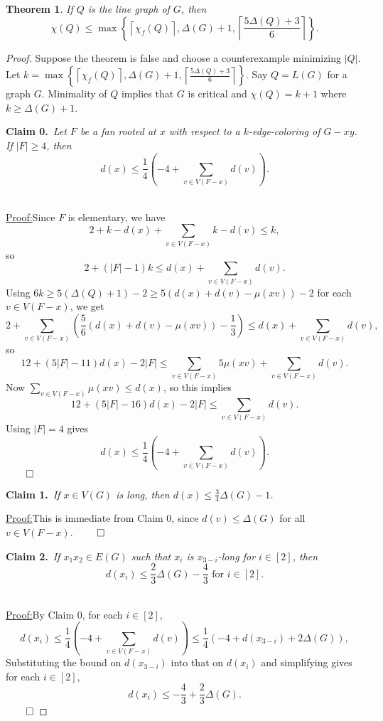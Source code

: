 \documentclass[12pt]{amsart}
\theoremstyle{plain}
\newtheorem{thm}{Theorem}
\theoremstyle{definition}
\theoremstyle{remark}
\newcommand{\set}[1]{\left\{ #1 \right\}}
\newcommand{\card}[1]{\left|#1\right|}
\newcommand{\ceil}[1]{\left\lceil#1\right\rceil}
\newcommand{\irange}[1]{\left[#1\right]}
\newcommand{\parens}[1]{\left( #1 \right)}
\newcommand{\claim}[2]{{\noindent\bf Claim #1.}~{\it #2}~~}
\newenvironment{claimproof}[1]{\par\noindent\underline{Proof:}\space#1}{\leavevmode\unskip\penalty9999
\hbox{}\nobreak\hfill\quad\hbox{$\qed$}}
\begin{document}
\begin{thm}
If $Q$ is the line graph of $G$, then
\[\chi(Q) \le \max\set{\ceil{\chi_f(Q)}, \Delta(G) + 1, \ceil{\frac{5\Delta(Q) + 3}{6}}}.\]
\end{thm}
\begin{proof}
Suppose the theorem is false and choose a counterexample minimizing $\card{Q}$.
Let $k = \max\set{\ceil{\chi_f(Q)}, \Delta(G) + 1, \ceil{\frac{5\Delta(Q) + 3}{6}}}$. Say $Q =
L(G)$ for a graph $G$. Minimality of $Q$ implies that $G$ is critical and $\chi(Q) = k+1$ where $k \ge \Delta(G) + 1$.

\bigskip

\claim{0}{Let $F$ be a fan rooted at $x$ with respect to a $k$-edge-coloring of $G - xy$.  If $|F| \ge 4$, then
\[d(x) \le \frac14\parens{-4 + \sum_{v \in V(F-x)} d(v)}.\]}
\begin{claimproof}
Since $F$ is elementary, we have
\[2 + k-d(x) + \sum_{v \in V(F-x)} k - d(v) \le k,\]
so
\[2 + (|F| - 1)k \le d(x) + \sum_{v \in V(F-x)} d(v).\]
Using $6k \ge 5(\Delta(Q) + 1) - 2 \ge 5(d(x) + d(v) - \mu(xv)) - 2$ for each $v \in V(F-x)$, we get
\[2 + \sum_{v \in V(F-x)}\parens{\frac56(d(x) + d(v) - \mu(xv)) -\frac13} \le d(x) + \sum_{v \in V(F-x)} d(v),\]
so
\[12 + \parens{5|F| - 11}d(x) - 2|F| \le \sum_{v \in V(F-x)} 5\mu(xv) + \sum_{v \in V(F-x)} d(v).\]
Now $\sum_{v \in V(F-x)} \mu(xv) \le d(x)$, so this implies
\[12 + \parens{5|F| - 16}d(x) - 2|F| \le \sum_{v \in V(F-x)} d(v).\]
Using $|F| = 4$ gives
\[d(x) \le \frac14\parens{-4 + \sum_{v \in V(F-x)} d(v)}.\]
\end{claimproof}
\bigskip

\claim{1}{If $x \in V(G)$ is long, then $d(x) \le \frac34\Delta(G) - 1$.}

\begin{claimproof}
This is immediate from Claim 0, since $d(v)\le \Delta(G)$ for all $v\in V(F-x)$.
\end{claimproof}
\bigskip

\claim{2}{If $x_1x_2 \in E(G)$ such that $x_i$ is $x_{3-i}$-long for $i \in \irange{2}$, then
\[d(x_i) \le \frac23\Delta(G) -\frac43 \text{ for $i \in \irange{2}$.}\]}

\begin{claimproof}
By Claim 0, for each $i \in \irange{2}$,
\[d(x_i) \le \frac14\parens{-4 + \sum_{v \in V(F-x)} d(v)} \le \frac14\parens{-4 + d(x_{3-i}) + 2\Delta(G)},\]
Substituting the bound on $d(x_{3-i})$ into that on $d(x_i)$ and simplifying
gives for each $i \in \irange{2}$,
\[d(x_i) \le -\frac43 + \frac23\Delta(G).\]
\end{claimproof}


\end{proof}
\end{document}

